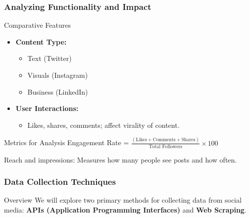 \documentclass{beamer}
\begin{document}
\begin{frame}[fragile]
    \frametitle{Analyzing Functionality and Impact}
    
    \begin{block}{Comparative Features}
        \begin{itemize}
            \item \textbf{Content Type:} 
                \begin{itemize}
                    \item Text (Twitter)
                    \item Visuals (Instagram)
                    \item Business (LinkedIn)
                \end{itemize}
            \item \textbf{User Interactions:} 
                \begin{itemize}
                    \item Likes, shares, comments; affect virality of content.
                \end{itemize}
        \end{itemize}
    \end{block}
    
    \begin{block}{Metrics for Analysis}
        Engagement Rate = $\frac{(\text{Likes} + \text{Comments} + \text{Shares})}{\text{Total Followers}} \times 100$
        
        Reach and impressions: Measures how many people see posts and how often.
    \end{block}
    
\end{frame}

\begin{frame}
    \frametitle{Data Collection Techniques}
    \begin{block}{Overview}
        We will explore two primary methods for collecting data from social media: 
        \textbf{APIs (Application Programming Interfaces)} and \textbf{Web Scraping}.
    \end{block}
\end{frame}
\end{document}
